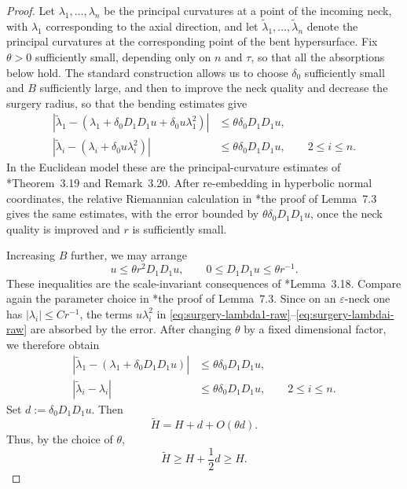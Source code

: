 \documentclass[11pt,reqno]{amsart}
\theoremstyle{definition}
\theoremstyle{remark}
\numberwithin{equation}{section}
\newcommand{\eps}{\varepsilon}
\begin{document}
\begin{proof}
  Let $\lambda_1,\ldots,\lambda_n$ be the principal curvatures at a point of
  the incoming neck, with $\lambda_1$ corresponding to the axial direction,
  and let
  $\widetilde\lambda_1,\ldots,\widetilde\lambda_n$ denote the principal
  curvatures at the corresponding point of the bent hypersurface.  Fix
  $\theta>0$ sufficiently small, depending only on $n$ and $\tau$, so that
  all the absorptions below hold.  The standard construction allows us to
  choose $\delta_0$ sufficiently small and $B$ sufficiently large, and then to
  improve the neck quality and decrease the surgery radius, so that the
  bending estimates give
  \begin{align}
    \left|
    \widetilde\lambda_1-
    \left(
    \lambda_1+\delta_0D_1D_1u+\delta_0u\lambda_1^2
    \right)
    \right|
    &\leq
    \theta\delta_0D_1D_1u,
    \label{eq:surgery-lambda1-raw}\\
    \left|
    \widetilde\lambda_i-
    \left(
    \lambda_i+\delta_0u\lambda_i^2
    \right)
    \right|
    &\leq
    \theta\delta_0D_1D_1u,
    \qquad 2\leq i\leq n.
    \label{eq:surgery-lambdai-raw}
  \end{align}
  In the Euclidean model these are the principal-curvature estimates of
  \cite{HS09}*{Theorem~3.19 and Remark~3.20}.  After re-embedding in
  hyperbolic normal coordinates, the relative Riemannian calculation in
  \cite{BH17}*{the proof of Lemma~7.3} gives the same estimates, with the
  error bounded by $\theta\delta_0D_1D_1u$, once the neck quality is improved
  and $r$ is sufficiently small.

  Increasing $B$ further, we may arrange
  \begin{equation}\label{eq:surgery-bending-smallness}
    u\leq\theta r^2D_1D_1u,
    \qquad
    0\leq D_1D_1u\leq\theta r^{-1}.
  \end{equation}
  These inequalities are the scale-invariant consequences of
  \cite{HS09}*{Lemma~3.18}. Compare again the parameter choice in
  \cite{BH17}*{the proof of Lemma~7.3}.
  Since on an $\eps$-neck one has $|\lambda_i|\leq Cr^{-1}$, the terms
  $u\lambda_i^2$ in
  \eqref{eq:surgery-lambda1-raw}--\eqref{eq:surgery-lambdai-raw}
  are absorbed by the error.  After changing $\theta$ by a fixed
  dimensional factor, we therefore obtain
  \begin{align}
    \left|
    \widetilde\lambda_1-
    \left(\lambda_1+\delta_0D_1D_1u\right)
    \right|
    &\leq
    \theta\delta_0D_1D_1u,
    \label{eq:surgery-lambda1}\\
    |\widetilde\lambda_i-\lambda_i|
    &\leq
    \theta\delta_0D_1D_1u,
    \qquad 2\leq i\leq n.
    \label{eq:surgery-lambdai}
  \end{align}
  Set $d:=\delta_0D_1D_1u$.  
  Then
  \begin{equation}\label{eq:surgery-H-expansion}
    \widetilde H
    =
    H+d+O(\theta d).
  \end{equation}
  Thus, by the choice of $\theta$,
  \begin{equation}\label{eq:surgery-H-bent}
    \widetilde H\geq H+\frac12d\geq H.
  \end{equation}


\end{proof}
\end{document}
